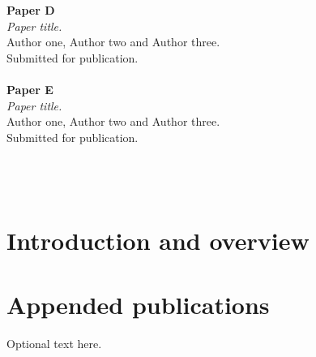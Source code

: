 \documentclass[twoside,openright,11pt]{book}
\begin{document}
\textbf{Paper D} \\
\textsl{Paper title.} \\
Author one, Author two and Author three.\\
Submitted for publication. \\ \\
\textbf{Paper E} \\
\textsl{Paper title.} \\
Author one, Author two and Author three.\\
Submitted for publication. \\ \\
~\vspace{-5pt} \\
~\vspace{-5pt} \\

\part{Introduction and overview}
\mainmatter
\pagestyle{fancy}
 
% 



\renewcommand{\bibname}{References}
\backmatter
\clearpage
{}
{}



\pagestyle{empty}
\part{Appended publications}
\thispagestyle{empty}

\cleardoublepage
\thispagestyle{empty}
\vspace*{2cm} %
\begin{minipage}{8cm}
Optional text here.
\end{minipage}%
\hfill{ 
\fontsize{20}{30}\selectfont {\bf Paper~A}}\marginpar{\rule[-4mm]{50mm}{14mm}} %
\vfill

\cleardoublepage

\end{document}
